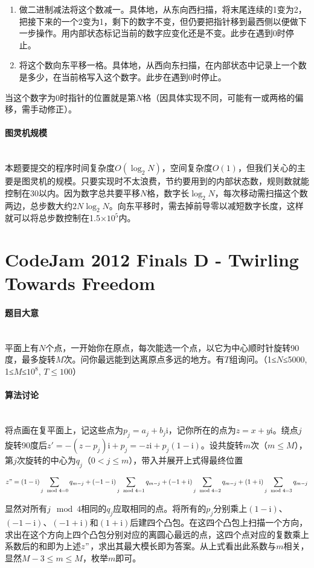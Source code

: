 \documentclass[UTF8]{ctexart}
\newcommand{\myparagraph}[1]{\paragraph{#1}\mbox{}\\}
\theoremstyle{nonumberplain}
\begin{document}
			\begin{enumerate}
				\item 做二进制减法将这个数减一。具体地，从东向西扫描，将末尾连续的1变为2，把接下来的一个2变为1，剩下的数字不变，但仍要把指针移到最西侧以便做下一步操作。用内部状态标记当前的数字应变化还是不变。此步在遇到0时停止。
				\item 将这个数向东平移一格。具体地，从西向东扫描，在内部状态中记录上一个数是多少，在当前格写入这个数字。此步在遇到0时停止。
			\end{enumerate}
			
			当这个数字为0时指针的位置就是第$N$格（因具体实现不同，可能有一或两格的偏移，需手动修正）。
		
		\myparagraph{图灵机规模}
		
			本题要提交的程序时间复杂度$O(\log_2N)$，空间复杂度$O(1)$，但我们关心的主要是图灵机的规模。只要实现时不太浪费，节约要用到的内部状态数，规则数就能控制在$30$以内。因为数字总共要平移$N$格，数字长$\log_2N$，每次移动需扫描这个数两边，总步数大约$2N\log_2N$。向东平移时，需去掉前导零以减短数字长度，这样就可以将总步数控制在1.5×$10^5$内。
	
	\section{CodeJam 2012 Finals D - Twirling Towards Freedom}
	
		\myparagraph{题目大意}
		
			平面上有$N$个点，一开始你在原点，每次能选一个点，以它为中心顺时针旋转90度，最多旋转$M$次。问你最远能到达离原点多远的地方。有$T$组询问。（1≤$N$≤5000, 1≤$M$≤$10^8$, $T \leq 100$）
		
		\myparagraph{算法讨论}
		
			将点画在复平面上，记这些点为$p_j=a_j+b_j\mathrm{i}$，记你所在的点为$z=x+y\mathrm{i}$。绕点$j$旋转90度后$z'=-(z-p_j)\mathrm{i}+p_j=-z\mathrm{i}+p_j(1-\mathrm{i})$。设共旋转$m$次（$m \leq M$），第$j$次旋转的中心为$q_j$（$0<j \leq m$），带入并展开上式得最终位置
			
			$$z"=(1-\mathrm{i})\sum_{j\mod 4=0}q_{m-j}+(-1-\mathrm{i})\sum_{j\mod 4=1}q_{m-j}+(-1+\mathrm{i})\sum_{j\mod 4=2}q_{m-j}+(1+\mathrm{i})\sum_{j\mod 4=3}q_{m-j}$$
			
			显然对所有$j\mod 4$相同的$q_j$应取相同的点。将所有的$p_j$分别乘上$(1-\mathrm{i})$、$(-1-\mathrm{i})$、$(-1+\mathrm{i})$和$(1+\mathrm{i})$后建四个凸包。在这四个凸包上扫描一个方向，求出在这个方向上四个凸包分别对应的离圆心最远的点，这四个点对应的复数乘上系数后的和即为上述$z"$，求出其最大模长即为答案。从上式看出此系数与$m$相关，显然$M-3 \leq m \leq M$，枚举$m$即可。
		
\end{document}
